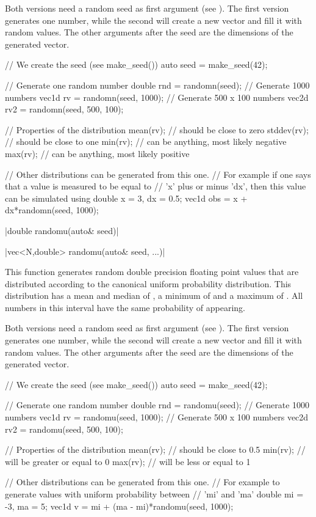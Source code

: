 Both versions need a random seed as first argument (see ). The first version generates one number, while the second will create a new vector and fill it with random values. The other arguments after the seed are the dimensions of the generated vector.

\begin{example}
\begin{cppcode}
// We create the seed (see make_seed())
auto seed = make_seed(42);

// Generate one random number
double rnd = randomn(seed);
// Generate 1000 numbers
vec1d rv = randomn(seed, 1000);
// Generate 500 x 100 numbers
vec2d rv2 = randomn(seed, 500, 100);

// Properties of the distribution
mean(rv); // should be close to zero
stddev(rv); // should be close to one
min(rv); // can be anything, most likely negative
max(rv); // can be anything, most likely positive

// Other distributions can be generated from this one.
// For example if one says that a value is measured to be equal to
// 'x' plus or minus 'dx', then this value can be simulated using
double x = 3, dx = 0.5;
vec1d obs = x + dx*randomn(seed, 1000);
\end{cppcode}
\end{example}

\funcitem \cppinline|double randomu(auto& seed)| 

\cppinline|vec<N,double> randomu(auto& seed, ...)|

This function generates random double precision floating point values that are distributed according to the canonical uniform probability distribution. This distribution has a mean and median of , a minimum of  and a maximum of . All numbers in this interval have the same probability of appearing.

Both versions need a random seed as first argument (see ). The first version generates one number, while the second will create a new vector and fill it with random values. The other arguments after the seed are the dimensions of the generated vector.

\begin{example}
\begin{cppcode}
// We create the seed (see make_seed())
auto seed = make_seed(42);

// Generate one random number
double rnd = randomu(seed);
// Generate 1000 numbers
vec1d rv = randomu(seed, 1000);
// Generate 500 x 100 numbers
vec2d rv2 = randomu(seed, 500, 100);

// Properties of the distribution
mean(rv); // should be close to 0.5
min(rv); // will be greater or equal to 0
max(rv); // will be less or equal to 1

// Other distributions can be generated from this one.
// For example to generate values with uniform probability between
// 'mi' and 'ma'
double mi = -3, ma = 5;
vec1d v = mi + (ma - mi)*randomu(seed, 1000);
\end{cppcode}
\end{example}

